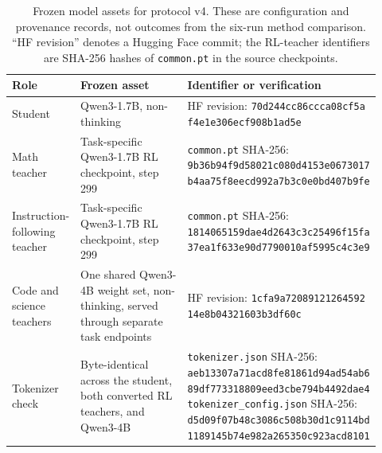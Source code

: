 \begin{table}[H]
\centering
\footnotesize
\caption{Frozen model assets for protocol v4. These are configuration and
provenance records, not outcomes from the six-run method comparison. ``HF
revision'' denotes a Hugging Face commit; the RL-teacher identifiers are
SHA-256 hashes of \texttt{common.pt} in the source checkpoints.}
\label{tab:v4_frozen_assets}
\setlength{\tabcolsep}{4pt}
\begin{tabular}{p{0.16\linewidth}p{0.30\linewidth}p{0.46\linewidth}}
\toprule
Role & Frozen asset & Identifier or verification \tabularnewline
\midrule
Student & Qwen3-1.7B, non-thinking &
HF revision:\newline
\texttt{70d244cc86ccca08cf5a}\newline
\texttt{f4e1e306ecf908b1ad5e} \tabularnewline
\addlinespace
Math teacher & Task-specific Qwen3-1.7B RL checkpoint, step 299 &
\texttt{common.pt} SHA-256:\newline
\texttt{9b36b94f9d58021c080d4153e0673017}\newline
\texttt{b4aa75f8eecd992a7b3c0e0bd407b9fe} \tabularnewline
\addlinespace
Instruction-following teacher & Task-specific Qwen3-1.7B RL checkpoint,
step 299 &
\texttt{common.pt} SHA-256:\newline
\texttt{1814065159dae4d2643c3c25496f15fa}\newline
\texttt{37ea1f633e90d7790010af5995c4c3e9} \tabularnewline
\addlinespace
Code and science teachers & One shared Qwen3-4B weight set, non-thinking,
served through separate task endpoints &
HF revision:\newline
\texttt{1cfa9a72089121264592}\newline
\texttt{14e8b04321603b3df60c} \tabularnewline
\addlinespace
Tokenizer check & Byte-identical across the student, both converted RL
teachers, and Qwen3-4B &
\texttt{tokenizer.json} SHA-256:\newline
\texttt{aeb13307a71acd8fe81861d94ad54ab6}\newline
\texttt{89df773318809eed3cbe794b4492dae4}\newline
\texttt{tokenizer\_config.json} SHA-256:\newline
\texttt{d5d09f07b48c3086c508b30d1c9114bd}\newline
\texttt{1189145b74e982a265350c923acd8101} \tabularnewline
\bottomrule
\end{tabular}
\end{table}
